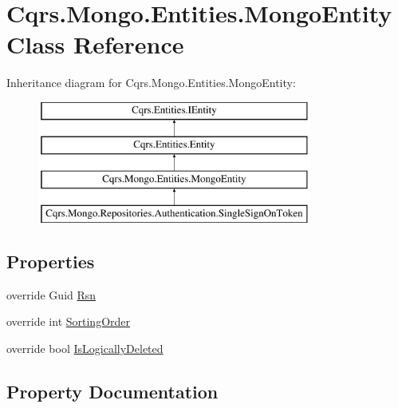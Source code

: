 \hypertarget{classCqrs_1_1Mongo_1_1Entities_1_1MongoEntity}{}\section{Cqrs.\+Mongo.\+Entities.\+Mongo\+Entity Class Reference}
\label{classCqrs_1_1Mongo_1_1Entities_1_1MongoEntity}
Inheritance diagram for Cqrs.\+Mongo.\+Entities.\+Mongo\+Entity\+:\begin{figure}[H]
\begin{center}
\leavevmode
\includegraphics[height=4.000000cm]{classCqrs_1_1Mongo_1_1Entities_1_1MongoEntity}
\end{center}
\end{figure}
\subsection*{Properties}
\begin{DoxyCompactItemize}
\item 
override Guid \hyperlink{classCqrs_1_1Mongo_1_1Entities_1_1MongoEntity_a445634030176c4991c0de152981c19ce}{Rsn}
\item 
override int \hyperlink{classCqrs_1_1Mongo_1_1Entities_1_1MongoEntity_a2f22c031f0aaa7b1b5eb6798d43d1ed2}{Sorting\+Order}
\item 
override bool \hyperlink{classCqrs_1_1Mongo_1_1Entities_1_1MongoEntity_a4dddb6f6df1cad227b817e5f54a3e211}{Is\+Logically\+Deleted}
\end{DoxyCompactItemize}


\subsection{Property Documentation}
\mbox{\label{classCqrs_1_1Mongo_1_1Entities_1_1MongoEntity_a4dddb6f6df1cad227b817e5f54a3e211}} 
